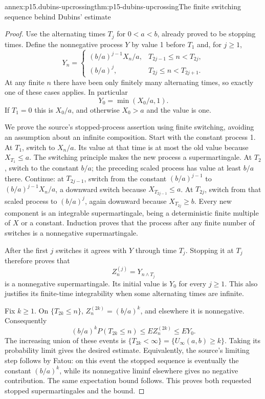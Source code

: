 \begin{annexitem}{annex:p15.dubins-upcrossing}{thm:p15-dubins-upcrossing}{The finite switching sequence behind Dubins' estimate}
\begin{proof}
Use the alternating times \(T_j\) for \(0<a<b\), already
proved to be stopping times. Define the nonnegative process
\(Y\) by value 1 before \(T_1\) and, for \(j\geq1\),
\[
 Y_n=
 \begin{cases}
  (b/a)^{j-1}X_n/a,&T_{2j-1}\leq n<T_{2j},\\
  (b/a)^j,&T_{2j}\leq n<T_{2j+1}.
 \end{cases}
\]
At any finite \(n\) there have been only finitely many alternating
times, so exactly one of these cases applies.
In particular
\[
                              Y_0=\min(X_0/a,1).
\]
If \(T_1=0\) this is \(X_0/a\), and otherwise \(X_0>a\)
and the value is one.

We prove the source's stopped-process assertion using finite
switching, avoiding an assumption about an infinite composition.
Start with the constant process 1.
At \(T_1\), switch to \(X_n/a\).
Its value at that time is at most the old value because
\(X_{T_1}\leq a\).
The switching principle makes the new process a supermartingale.
At \(T_2\), switch to the constant \(b/a\); the preceding
scaled process has value at least \(b/a\) there.
Continue: at \(T_{2j-1}\), switch from the constant
\((b/a)^{j-1}\) to \((b/a)^{j-1}X_n/a\), a downward
switch because \(X_{T_{2j-1}}\leq a\).
At \(T_{2j}\), switch from that scaled process to
\((b/a)^j\), again downward because \(X_{T_{2j}}\geq b\).
Every new component is an integrable supermartingale, being
a deterministic finite multiple of \(X\) or a constant.
Induction proves that the process after any finite number
of switches is a nonnegative supermartingale.

After the first \(j\) switches it agrees with \(Y\) through
time \(T_j\). Stopping it at \(T_j\) therefore proves that
\[
                              Z_n^{(j)}=Y_{n\wedge T_j}
\]
is a nonnegative supermartingale.
Its initial value is \(Y_0\) for every \(j\geq1\).
This also justifies its finite-time integrability when some
alternating times are infinite.

Fix \(k\geq1\). On \(\{T_{2k}\leq n\}\),
\(Z_n^{(2k)}=(b/a)^k\), and elsewhere it is nonnegative.
Consequently
\[
             (b/a)^kP(T_{2k}\leq n)
                    \leq EZ_n^{(2k)}\leq EY_0.
\]
The increasing union of these events is
\(\{T_{2k}<\infty\}=\{U_\infty(a,b)\geq k\}\).
Taking its probability limit gives the desired estimate.
Equivalently, the source's limiting step follows by Fatou:
on this event the stopped sequence is eventually the constant
\((b/a)^k\), while its nonnegative liminf elsewhere gives no
negative contribution. The same expectation bound follows.
This proves both requested stopped supermartingales and the bound.
\end{proof}
\end{annexitem}

